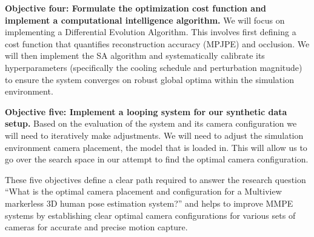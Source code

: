 \textbf{Objective four: Formulate the optimization cost function and implement a computational intelligence algorithm.} We will focus on implementing a Differential Evolution Algorithm. This involves first defining a cost function that quantifies reconstruction accuracy (MPJPE) and occlusion. We will then implement the SA algorithm and systematically calibrate its hyperparameters (specifically the cooling schedule and perturbation magnitude) to ensure the system converges on robust global optima within the simulation environment.

\textbf{Objective five: Implement a looping system for our synthetic data setup.} Based on the evaluation of the system and its camera configuration we will need to iteratively make adjustments. We will need to adjust the simulation environment camera placement, the model that is loaded in. This will allow us to go over the search space in our attempt to find the optimal camera configuration.


These five objectives define a clear path required to answer the research question ``What is the optimal camera placement and configuration for a Multiview markerless 3D human pose estimation system?'' and helps to improve MMPE systems by establishing clear optimal camera configurations for various sets of cameras for accurate and precise motion capture. 
